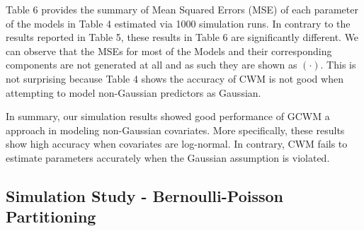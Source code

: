 \documentclass[11pt,letterpaper]{article}
\numberwithin{equation}{section}
\numberwithin{equation}{section}
\numberwithin{equation}{section}
\begin{document}
Table 6 provides the summary of Mean Squared Errors (MSE) of each parameter of the models in Table 4 estimated via 1000 simulation runs.
In contrary to the results reported in Table 5, these results in Table 6 are significantly different. We can observe that the MSEs for most of the Models and their corresponding components are not generated at all and as such they are shown as $(\cdot)$. This is not surprising because Table 4 shows the accuracy of CWM is not good when attempting to model non-Gaussian predictors as Gaussian.

In summary, our simulation results showed good performance of  GCWM a approach in modeling non-Gaussian covariates. More specifically, these results show high accuracy when covariates are log-normal. In contrary, CWM fails to estimate parameters accurately when the Gaussian assumption is violated.

\subsection{Simulation Study - Bernoulli-Poisson Partitioning}
\end{document}
